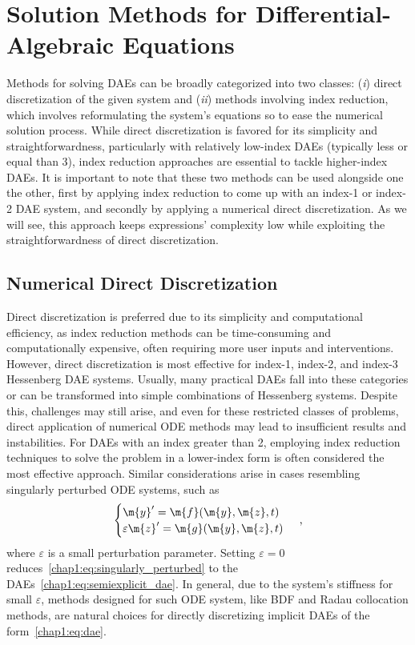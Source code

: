 
\section{Solution Methods for Differential-Algebraic Equations}

Methods for solving \acp{DAE} can be broadly categorized into two classes: (\emph{i}) direct discretization of the given system and (\emph{ii}) methods involving index reduction, which involves reformulating the system's equations so to ease the numerical solution process. While direct discretization is favored for its simplicity and straightforwardness, particularly with relatively low-index \acp{DAE} (typically less or equal than 3), index reduction approaches are essential to tackle higher-index \acp{DAE}. It is important to note that these two methods can be used alongside one the other, first by applying index reduction to come up with an index-1 or index-2 \ac{DAE} system, and secondly by applying a numerical direct discretization. As we will see, this approach keeps expressions' complexity low while exploiting the straightforwardness of direct discretization.

\subsection{Numerical Direct Discretization}

Direct discretization is preferred due to its simplicity and computational efficiency, as index reduction methods can be time-consuming and computationally expensive, often requiring more user inputs and interventions. However, direct discretization is most effective for index-1, index-2, and index-3 Hessenberg \ac{DAE} systems. Usually, many practical \acp{DAE} fall into these categories or can be transformed into simple combinations of Hessenberg systems. Despite this, challenges may still arise, and even for these restricted classes of problems, direct application of numerical \ac{ODE} methods may lead to insufficient results and instabilities. For \acp{DAE} with an index greater than 2, employing index reduction techniques to solve the problem in a lower-index form is often considered the most effective approach. Similar considerations arise in cases resembling singularly perturbed \ac{ODE} systems, such as
%
\begin{equation}
  \begin{cases}
  \m{y}^{\prime} = \m{f}(\m{y}, \m{z}, t) \\
  \varepsilon \m{z}^{\prime} = \m{g}(\m{y}, \m{z}, t)
  \end{cases} \, \text{,}
  \label{chap1:eq:singularly_perturbed}
\end{equation}
%
where $\varepsilon$ is a small perturbation parameter. Setting $\varepsilon = 0$ reduces~\eqref{chap1:eq:singularly_perturbed} to the \acp{DAE}~\eqref{chap1:eq:semiexplicit_dae}. In general, due to the system's stiffness for small $\varepsilon$, methods designed for such \ac{ODE} system, like \ac{BDF} and Radau collocation methods, are natural choices for directly discretizing implicit \acp{DAE} of the form~\eqref{chap1:eq:dae}.

